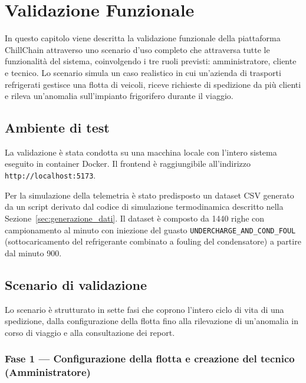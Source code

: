 \chapter{Validazione Funzionale}
\label{ch:validazione}

In questo capitolo viene descritta la validazione funzionale della piattaforma ChillChain attraverso uno scenario d'uso completo che attraversa tutte le funzionalità del sistema, coinvolgendo i tre ruoli previsti: amministratore, cliente e tecnico. Lo scenario simula un caso realistico in cui un'azienda di trasporti refrigerati gestisce una flotta di veicoli, riceve richieste di spedizione da più clienti e rileva un'anomalia sull'impianto frigorifero durante il viaggio.


\section{Ambiente di test}
\label{sec:ambiente_test}

La validazione è stata condotta su una macchina locale con l'intero sistema eseguito in container Docker. Il frontend è raggiungibile all'indirizzo \texttt{http://localhost:5173}.

Per la simulazione della telemetria è stato predisposto un dataset CSV generato da un script derivato dal codice di simulazione termodinamica descritto nella Sezione~\ref{sec:generazione_dati}. Il dataset è composto da 1440 righe con campionamento al minuto con iniezione del guasto \texttt{UNDERCHARGE\_AND\_COND\_FOUL} (sottocaricamento del refrigerante combinato a fouling del condensatore) a partire dal minuto 900. 


\section{Scenario di validazione}
\label{sec:scenario}

Lo scenario è strutturato in sette fasi che coprono l'intero ciclo di vita di una spedizione, dalla configurazione della flotta fino alla rilevazione di un'anomalia in corso di viaggio e alla consultazione dei report.


\subsection{Fase 1 --- Configurazione della flotta e creazione del tecnico (Amministratore)}
\label{subsec:fase1}

